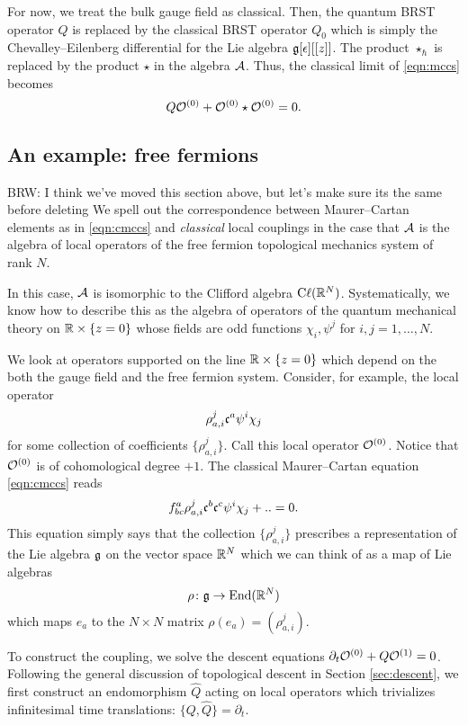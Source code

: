 \documentclass[11pt]{amsart}
\def\brian#1{{\textcolor{blue!65!red}{BRW: {#1}}}}
\begin{document}
For now, we treat the bulk gauge field as classical.
Then, the quantum BRST operator $Q$ is replaced by the classical BRST operator $Q_0$ which is simply the Chevalley--Eilenberg differential for the Lie algebra $\mathfrak g[\epsilon][[z]]$.
The product $\star_\hbar$ is replaced by the product $\star$ in the algebra $\mathcal A$. 
Thus, the classical limit of \eqref{eqn:mccs} becomes
\begin{equation}\label{eqn:cmccs}
Q \mathcal O^{(0)} + \mathcal O^{(0)} \star \mathcal O^{(0)} = 0 .
\end{equation}

\subsection*{An example: free fermions}
\brian{I think we've moved this section above, but let's make sure its the same before deleting}
We spell out the correspondence between Maurer--Cartan elements as in \eqref{eqn:cmccs} and {\em classical} local couplings in the case that $\mathcal A$ is the algebra of local operators of the free fermion topological mechanics system of rank $N$. 

In this case, $\mathcal A$ is isomorphic to the Clifford algebra ${\rm C}\ell(\mathbb R^N)$. 
Systematically, we know how to describe this as the algebra of operators of the quantum mechanical theory on $\mathbb R \times \{z=0\}$ whose fields are odd functions $\chi_i, \psi^j$ for $i,j=1,\ldots, N$. 

We look at operators supported on the line $\mathbb R \times \{z=0\}$ which depend on the both the gauge field and the free fermion system.
Consider, for example, the local operator
\[
\rho_{a,i}^{j} \mathfrak c^a \psi^i \chi_j 
\]
for some collection of coefficients $\{\rho_{a,i}^{j}\}$. 
Call this local operator $\mathcal O^{(0)}$. 
Notice that $\mathcal O^{(0)}$ is of cohomological degree $+1$.
The classical Maurer--Cartan equation \eqref{eqn:cmccs} reads
\[
f_{bc}^a \rho_{a,i}^{j}  \mathfrak c^b \mathfrak c^c \psi^i \chi_j + .. = 0. 
\]
This equation simply says that the collection $\{\rho_{a,i}^{j} \}$ prescribes a representation of the Lie algebra $\mathfrak g$ on the vector space $\mathbb R^N$ which we can think of as a map of Lie algebras 
\[
\rho \colon \mathfrak g \to {\rm End}(\mathbb R^N)
\]
which maps $e_a$ to the $N \times N$ matrix $\rho(e_a) = (\rho_{a,i}^{j})$. 

To construct the coupling, we solve the descent equations $\partial_t \mathcal O^{(0)} + Q \mathcal O^{(1)} = 0$.
Following the general discussion of topological descent in Section \ref{sec:descent}, we first construct an endomorphism $\hat{Q}$ acting on local operators which trivializes infinitesimal time translations: $\{Q, \hat{Q}\} = \partial_t$. 
\end{document}
